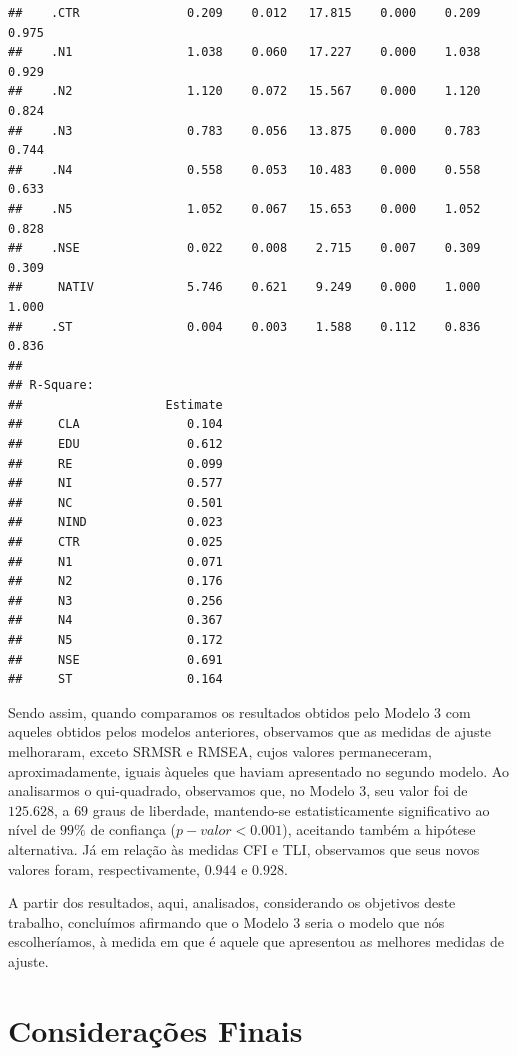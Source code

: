 \documentclass[
  12pt,
]{article}
\begin{document}
\begin{verbatim}
##    .CTR               0.209    0.012   17.815    0.000    0.209    0.975
##    .N1                1.038    0.060   17.227    0.000    1.038    0.929
##    .N2                1.120    0.072   15.567    0.000    1.120    0.824
##    .N3                0.783    0.056   13.875    0.000    0.783    0.744
##    .N4                0.558    0.053   10.483    0.000    0.558    0.633
##    .N5                1.052    0.067   15.653    0.000    1.052    0.828
##    .NSE               0.022    0.008    2.715    0.007    0.309    0.309
##     NATIV             5.746    0.621    9.249    0.000    1.000    1.000
##    .ST                0.004    0.003    1.588    0.112    0.836    0.836
## 
## R-Square:
##                    Estimate
##     CLA               0.104
##     EDU               0.612
##     RE                0.099
##     NI                0.577
##     NC                0.501
##     NIND              0.023
##     CTR               0.025
##     N1                0.071
##     N2                0.176
##     N3                0.256
##     N4                0.367
##     N5                0.172
##     NSE               0.691
##     ST                0.164
\end{verbatim}

\normalsize
\onehalfspacing

Sendo assim, quando comparamos os resultados obtidos pelo Modelo 3 com
aqueles obtidos pelos modelos anteriores, observamos que as medidas de
ajuste melhoraram, exceto SRMSR e RMSEA, cujos valores permaneceram,
aproximadamente, iguais àqueles que haviam apresentado no segundo
modelo. Ao analisarmos o qui-quadrado, observamos que, no Modelo 3, seu
valor foi de \(125.628\), a \(69\) graus de liberdade, mantendo-se
estatisticamente significativo ao nível de \(99\%\) de confiança
(\(p-valor < 0.001\)), aceitando também a hipótese alternativa. Já em
relação às medidas CFI e TLI, observamos que seus novos valores foram,
respectivamente, \(0.944\) e \(0.928\).

A partir dos resultados, aqui, analisados, considerando os objetivos
deste trabalho, concluímos afirmando que o Modelo 3 seria o modelo que
nós escolheríamos, à medida em que é aquele que apresentou as melhores
medidas de ajuste.

\hypertarget{considerauxe7uxf5es-finais}{%
\section{Considerações Finais}\label{considerauxe7uxf5es-finais}}
\end{document}
